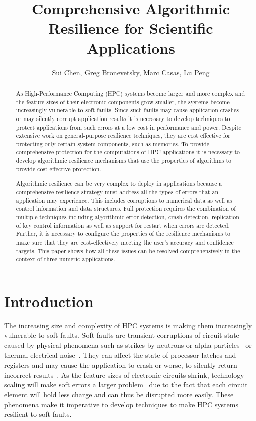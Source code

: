 \documentclass{sig-alternate}
\title{Comprehensive Algorithmic Resilience for Scientific Applications }
\author{Sui Chen,
Greg Bronevetsky, Marc Casas,
Lu Peng
}
\begin{document}
\maketitle

\begin{abstract}
As High-Performance Computing (HPC) systems become larger and more complex and the feature sizes of their electronic components grow smaller, the systems become increasingly vulnerable to soft faults.
Since such faults may cause application crashes or may silently corrupt application results it is necessary to develop techniques to protect applications from such errors at a low cost in performance and power.
Despite extensive work on general-purpose resilience techniques, they are cost effective for protecting only certain system components, such as memories.
To provide comprehensive protection for the computations of HPC applications it is necessary to develop algorithmic resilience mechanisms that use the properties of algorithms to provide cost-effective protection.

Algorithmic resilience can be very complex to deploy in applications because a comprehensive resilience strategy must address all the types of errors that an application may experience.
This includes corruptions to numerical data as well as control information and data structures.
Full protection requires the combination of multiple techniques including algorithmic error detection, crash detection, replication of key control information as well as support for restart when errors are detected.
Further, it is necessary to configure the properties of the resilience mechanisms to make sure that they are cost-effectively meeting the user's accuracy and confidence targets.
This paper shows how all these issues can be resolved comprehensively in the context of three numeric applications.

\end{abstract}

\section{Introduction}
\label{sec:intro}

The increasing size and complexity of HPC systems is making them increasingly vulnerable to soft faults.
Soft faults are transient corruptions of circuit state caused by physical phenomena such as strikes by neutrons or alpha particles~\cite{baumann:2005, asciQSER:2005} or thermal electrical noise~\cite{therm_noise:2007}.
They can affect the state of processor latches and registers and may cause the application to crash or worse, to silently return incorrect results~\cite{mpi_ser:reed:2004}.
As the feature sizes of electronic circuits shrink, technology scaling will make soft errors a larger problem~\cite{err_scaling:2012} due to the fact that each circuit element will hold less charge and can thus be disrupted more easily.
These phenomena make it imperative to develop techniques to make HPC systems resilient to soft faults.
\end{document}
